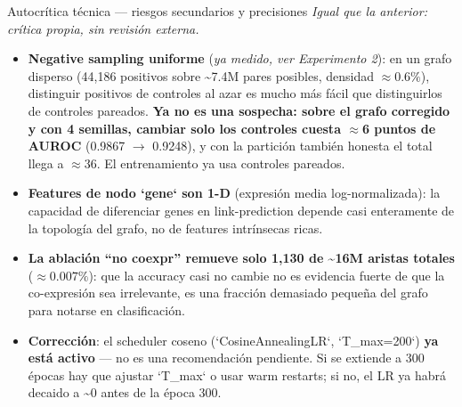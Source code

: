 
\begin{frame}{Autocr\'itica t\'ecnica --- riesgos secundarios y precisiones}
  \scriptsize\textit{Igual que la anterior: cr\'itica propia, sin revisi\'on externa.}

  \small
  \begin{itemize}
    \item \textbf{Negative sampling uniforme} (\emph{ya medido, ver Experimento 2}): en un grafo disperso (44,186 positivos sobre \textasciitilde 7.4M pares posibles, densidad $\approx 0.6\%$), distinguir positivos de controles al azar es mucho m\'as f\'acil que distinguirlos de controles pareados. \textbf{Ya no es una sospecha: sobre el grafo corregido y con 4 semillas, cambiar solo los controles cuesta $\approx$6 puntos de AUROC} (0.9867 $\to$ 0.9248), y con la partici\'on tambi\'en honesta el total llega a $\approx$36. El entrenamiento ya usa controles pareados.
    \item \textbf{Features de nodo `gene` son 1-D} (expresi\'on media log-normalizada): la capacidad de diferenciar genes en link-prediction depende casi enteramente de la topolog\'ia del grafo, no de features intr\'insecas ricas.
    \item \textbf{La ablaci\'on ``no coexpr'' remueve solo 1,130 de \textasciitilde 16M aristas totales} ($\approx 0.007\%$): que la accuracy casi no cambie no es evidencia fuerte de que la co-expresi\'on sea irrelevante, es una fracci\'on demasiado peque\~na del grafo para notarse en clasificaci\'on.
    \item \textbf{Correcci\'on}: el scheduler coseno (`CosineAnnealingLR`, `T\_max=200`) \textbf{ya est\'a activo} --- no es una recomendaci\'on pendiente. Si se extiende a 300 \'epocas hay que ajustar `T\_max` o usar warm restarts; si no, el LR ya habr\'a decaido a \textasciitilde 0 antes de la \'epoca 300.
  \end{itemize}
\end{frame}

